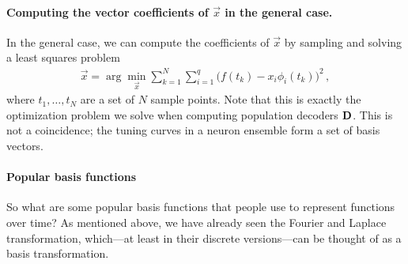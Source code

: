 \documentclass[10pt,letterpaper,oneside]{article}
\begin{document}
\paragraph{Computing the vector coefficients of $\vec x$ in the general case.}
In the general case, we can compute the coefficients of $\vec x$ by sampling and solving a least squares problem
\begin{align*}
	\vec x = \arg\min_{\vec x} \sum_{k = 1}^N \sum_{i = 1}^q \big( f(t_k) - x_i \phi_i(t_k) \big)^2 \,,
\end{align*}
where $t_1, \ldots, t_N$ are a set of $N$ sample points. Note that this is exactly the optimization problem we solve when computing population decoders ${\mathbf{D}}$. This is not a coincidence; the tuning curves in a neuron ensemble form a set of basis vectors.

\paragraph{Popular basis functions} So what are some popular basis functions that people use to represent functions over time? As mentioned above, we have already seen the Fourier and Laplace transformation, which---at least in their discrete versions---can be thought of as a basis transformation.
\end{document}
